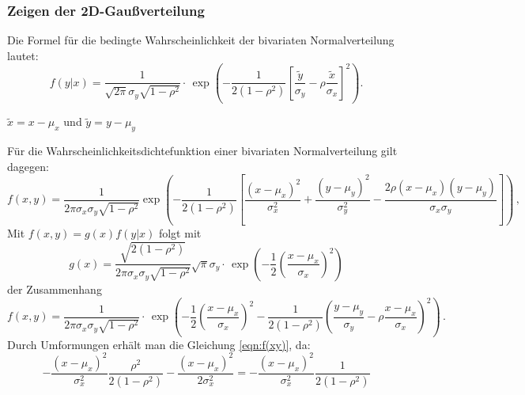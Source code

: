 \subsubsection{Zeigen der 2D-Gaußverteilung}
Die Formel für die bedingte Wahrscheinlichkeit der bivariaten Normalverteilung lautet:
\begin{equation}
f(y\lvert x) = \frac{1}{\sqrt{2\pi} \sigma_y \sqrt{1-\rho^2}} \cdot \,
\exp\left(-\frac{1}{2(1-\rho^2)} \left [ \frac{\tilde{y}}{\sigma_y}-\rho\frac{\tilde{x}}{\sigma_x} \right]^2 \right) \text{.}
\end{equation}
\begin{center}
  \tiny {$\tilde{x} = x - \mu_x$ und $\tilde{y} = y - \mu_y$}
\end{center}
Für die Wahrscheinlichkeitsdichtefunktion einer bivariaten Normalverteilung gilt dagegen:
\begin{equation}
f(x,y) =
      \frac{1}{2 \pi  \sigma_x \sigma_y \sqrt{1-\rho^2}}
      \exp\left(
        -\frac{1}{2(1-\rho^2)}\left[
          \frac{(x-\mu_x)^2}{\sigma_x^2} +
          \frac{(y-\mu_y)^2}{\sigma_y^2} -
          \frac{2\rho(x-\mu_x)(y-\mu_y)}{\sigma_x \sigma_y}
        \right]
      \right)\,, \label{eqn:f(xy)}
\end{equation}
Mit $f(x,y) = g(x) f(y \lvert x)$ folgt mit
\begin{equation}
g(x) = \frac{\sqrt{2(1-\rho^2)}}{2 \pi  \sigma_x \sigma_y \sqrt{1-\rho^2}} \sqrt{\pi} \sigma_y \cdot \,
       \exp\left( -\frac{1}{2} \left(\frac{x-\mu_x}{\sigma_x}\right)^2\right)
\end{equation}
der Zusammenhang
\begin{equation}
f(x,y) = \frac{1}{2 \pi  \sigma_x \sigma_y \sqrt{1-\rho^2}} \cdot \,
         \exp\left(-\frac{1}{2} \left(\frac{x-\mu_x}{\sigma_x}\right)^2
         - \frac{1}{2(1-\rho^2)} \left(\frac{y-\mu_y}{\sigma_y}-\rho\frac{x-\mu_x}{\sigma_x} \right)^2\right)\,.
\end{equation}
Durch Umformungen erhält man die Gleichung \eqref{eqn:f(xy)}, da:
\begin{equation}
  -\frac{(x-\mu_x)^2}{\sigma_x^2} \frac{\rho^2}{2(1-\rho^2)} - \frac{(x-\mu_x)^2}{2\sigma_x^2} = - \frac{(x-\mu_x)^2}{\sigma_x^2} \frac{1}{2(1-\rho^2)}
\end{equation}

